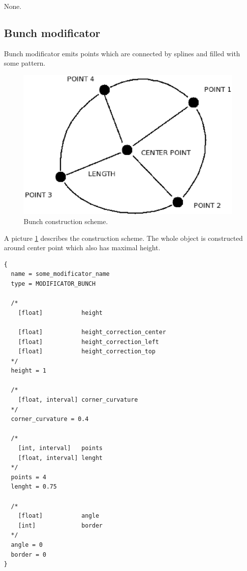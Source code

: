 \documentclass[9pt]{article}
\begin{document}
None.

\newpage
\subsection{Bunch modificator}

Bunch modificator emits points which are connected by splines
and filled with some pattern. 

\begin{figure}[h]
\begin{center}
  \includegraphics[scale=0.6]{p11.eps}
  \caption{Bunch construction scheme.}
  \label{bunch_example}
\end{center}
\end{figure}

A picture \ref{bunch_example} describes the construction scheme. The whole object 
is constructed around center point which also has maximal height.

\begin{verbatim}
{
  name = some_modificator_name
  type = MODIFICATOR_BUNCH

  /*
    [float]           height
    
    [float]           height_correction_center
    [float]           height_correction_left
    [float]           height_correction_top      
  */
  height = 1
  
  /*
    [float, interval] corner_curvature
  */
  corner_curvature = 0.4
    
  /*    
    [int, interval]   points
    [float, interval] lenght
  */
  points = 4
  lenght = 0.75  
    
  /*
    [float]           angle
    [int]             border
  */  
  angle = 0
  border = 0
}
\end{verbatim}
\end{document}
